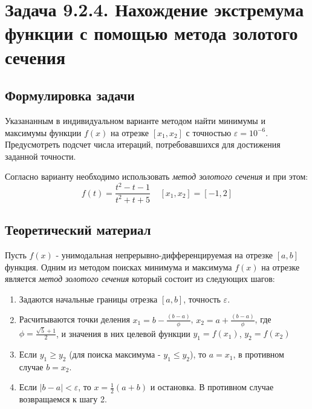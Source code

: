 \documentclass[12pt]{article}%
\begin{document}
\newpage
\section{Задача 9.2.4. Нахождение экстремума функции с помощью метода золотого сечения}
\subsection{Формулировка задачи}
Указананным в индивидуальном варианте методом найти минимумы и максимумы функции $f(x)$ на отрезке $[x_1, x_2]$ с точностью $\varepsilon=10^{-6}$. Предусмотреть подсчет числа итераций, потребовавшихся для достижения 
заданной точности.

Согласно варианту необходимо использовать \textit{метод золотого сечения} и при этом:
\[
f(t) = \frac{t^2 - t - 1}{t^2 + t + 5}\ \ \ \ \ [x_1, x_2] = [-1, 2]
\]

\subsection{Теоретический материал}
Пусть $f(x)$ - унимодальная непрерывно-дифференцируемая на отрезке $[a, b]$ функция. Одним из методом поисках минимума и максимума $f(x)$ на отрезке является \textit{метод золотого сечения} который состоит из следующих шагов: 
\begin{enumerate}
    \item Задаются начальные границы отрезка $[a, b]$, точность $\varepsilon$.
    \item Расчитываются точки деления $x_1 = b - \frac{(b - a)}{\phi}$, 
    $x_2 = a + \frac{(b - a)}{\phi}$, где $\phi = \frac{\sqrt{5} + 1}{2}$, и значения в них целевой функции $y_1 = f(x_1)$, $y_2 = f(x_2)$
    \item Если $y_1 \ge y_2$ (для поиска максимума - $y_1 \le y_2$), то $a = x_1$, в противном случае $b = x_2$.
    \item Если $|b - a| < \varepsilon$, то  $ x = \frac{1}{2}(a + b)$ и остановка. В противном случае возвращаемся к шагу 2. 
\end{enumerate}

\newpage
\end{document}
